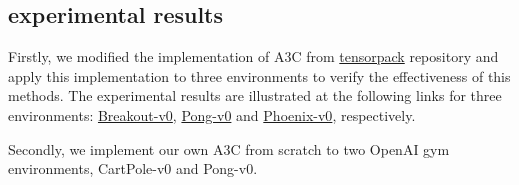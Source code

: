 



\subsection{experimental results}


Firstly, we modified the implementation of A3C from \href{https://github.com/ppwwyyxx/tensorpack}{tensorpack} repository and
apply this implementation to three environments to verify the effectiveness of this methods.
The experimental results are illustrated at the following links for three environments:
\href{https://gym.openai.com/evaluations/eval_i9E40nAQuOTiSa0bxYBA#reproducibility}{Breakout-v0}, 
\href{https://gym.openai.com/evaluations/eval_mvXuxP13SSacO01UIhsg#reproducibility}{Pong-v0} and 
\href{https://gym.openai.com/evaluations/eval_Gva8XrEvTQi63KOd5Gyq1Q#reproducibility}{Phoenix-v0}, respectively.

Secondly, we implement our own A3C from scratch to two OpenAI gym environments, CartPole-v0 and Pong-v0.


